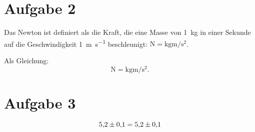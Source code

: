 \documentclass[titlepage=firstiscover]{scrartcl}
\begin{document}
\section{Aufgabe 2}
Das Newton ist definiert als die Kraft, die eine Masse von \SI{1}{\kilo\gram} in einer Sekunde auf die Geschwindigkeit \SI{1}{\meter\per\second} beschleunigt:
$\si{\newton} = \si{\kilo\gram\meter\per\second\squared}$.

Als Gleichung:
\begin{equation}
  \si{\newton} = \si{\kilo\gram\meter\per\second\squared} .
\end{equation}

\section{Aufgabe 3}

\begin{equation}
  \num{5.2(1)} = \num{5.2 +- 0.1}
\end{equation}
\end{document}

